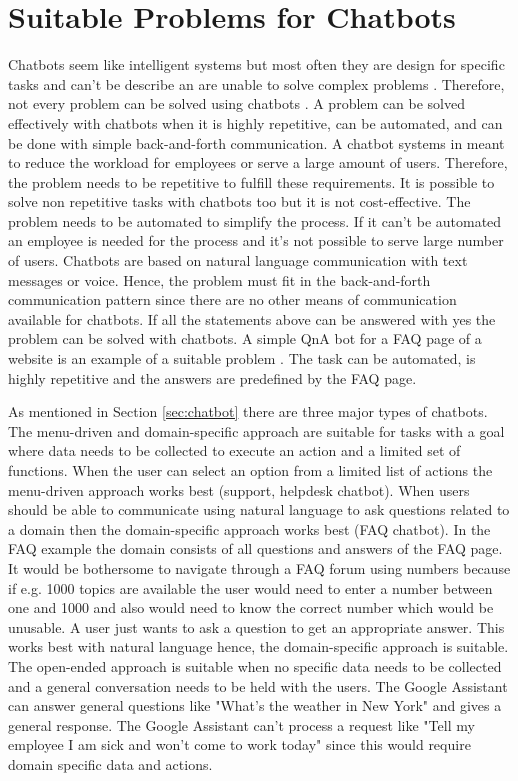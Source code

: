 \section{Suitable Problems for Chatbots} 
Chatbots seem like intelligent systems but most often they are design for specific tasks
and can't be describe an are unable to solve complex problems \cite{buiildChatbotsPython}.
Therefore, not every problem can be solved using chatbots \cite{buiildChatbotsPython}.
A problem can be solved effectively with chatbots when it is highly repetitive, can be automated, and 
can be done with simple back-and-forth communication.
A chatbot systems in meant to reduce the workload for employees or serve a large amount of users.
Therefore, the problem needs to be repetitive to fulfill these requirements.
It is possible to solve non repetitive tasks with chatbots too but it is not cost-effective.
The problem needs to be automated to simplify the process.
If it can't be automated an employee is needed for the process and it's not possible to 
serve large number of users.
Chatbots are based on natural language communication with text messages or voice.
Hence, the problem must fit in the back-and-forth communication pattern since there are no 
other means of communication available for chatbots.
If all the statements above can be answered with yes the problem can be solved with chatbots. 
A simple QnA bot for a FAQ page of a website is an example of a suitable problem \cite{buiildChatbotsPython}.
The task can be automated, is highly repetitive and the answers are predefined by the FAQ page.

As mentioned in Section \ref{sec:chatbot} there are three major types of chatbots.
The menu-driven and domain-specific approach are suitable for tasks with a goal where data needs to
be collected to execute an action and a limited set of functions. 
When the user can select an option from a limited list of actions the menu-driven approach works best
(support, helpdesk chatbot).
When users should be able to communicate using natural language to ask questions related to a
domain then the domain-specific approach works best (FAQ chatbot). In the FAQ example the domain 
consists of all questions and answers of the FAQ page.
It would be bothersome to navigate through a FAQ forum using numbers because if e.g. 1000 topics
are available the user would need to enter a number between one and 1000 and also would need to 
know the correct number which would be unusable.
A user just wants to ask a question to get an appropriate answer.
This works best with natural language hence, the domain-specific approach is suitable.
The open-ended approach is suitable when no specific data needs to be collected and a general 
conversation needs to be held with the users. 
The Google Assistant can answer general questions like "What's the weather in New York" and 
gives a general response.
The Google Assistant can't process a request like 
"Tell my employee I am sick and won't come to work today" since this would require domain specific 
data and actions.



